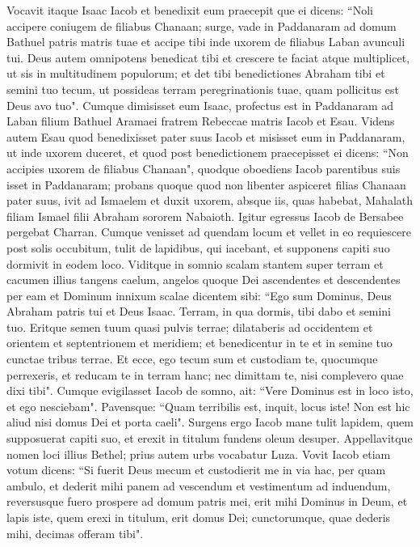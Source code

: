 \begin{biblechapter}  
\verse Vocavit itaque Isaac Iacob et benedixit eum praecepit que ei dicens: “Noli accipere coniugem de filiabus Chanaan; 
\verse surge, vade in Paddanaram ad domum Bathuel patris matris tuae et accipe tibi inde uxorem de filiabus Laban avunculi tui. 
\verse Deus autem omnipotens benedicat tibi et crescere te faciat atque multiplicet, ut sis in multitudinem populorum; 
\verse et det tibi benedictiones Abraham tibi et semini tuo tecum, ut possideas terram peregrinationis tuae, quam pollicitus est Deus avo tuo". 
\verse Cumque dimisisset eum Isaac, profectus est in Paddanaram ad Laban filium Bathuel Aramaei fratrem Rebeccae matris Iacob et Esau. 
\verse Videns autem Esau quod benedixisset pater suus Iacob et misisset eum in Paddanaram, ut inde uxorem duceret, et quod post benedictionem praecepisset ei dicens: “Non accipies uxorem de filiabus Chanaan", 
\verse quodque oboediens Iacob parentibus suis isset in Paddanaram; 
\verse probans quoque quod non libenter aspiceret filias Chanaan pater suus, 
\verse ivit ad Ismaelem et duxit uxorem, absque iis, quas habebat, Mahalath filiam Ismael filii Abraham sororem Nabaioth. 
\verse Igitur egressus Iacob de Bersabee pergebat Charran. 
\verse Cumque venisset ad quendam locum et vellet in eo requiescere post solis occubitum, tulit de lapidibus, qui iacebant, et supponens capiti suo dormivit in eodem loco. 
\verse Viditque in somnio scalam stantem super terram et cacumen illius tangens caelum, angelos quoque Dei ascendentes et descendentes per eam 
\verse et Dominum innixum scalae dicentem sibi: “Ego sum Dominus, Deus Abraham patris tui et Deus Isaac. Terram, in qua dormis, tibi dabo et semini tuo. 
\verse Eritque semen tuum quasi pulvis terrae; dilataberis ad occidentem et orientem et septentrionem et meridiem; et benedicentur in te et in semine tuo cunctae tribus terrae. 
\verse Et ecce, ego tecum sum et custodiam te, quocumque perrexeris, et reducam te in terram hanc; nec dimittam te, nisi complevero quae dixi tibi". 
\verse Cumque evigilasset Iacob de somno, ait: “Vere Dominus est in loco isto, et ego nesciebam". 
\verse Pavensque: “Quam terribilis est, inquit, locus iste! Non est hic aliud nisi domus Dei et porta caeli". 
\verse Surgens ergo Iacob mane tulit lapidem, quem supposuerat capiti suo, et erexit in titulum fundens oleum desuper. 
\verse Appellavitque nomen loci illius Bethel; prius autem urbs vocabatur Luza. 
\verse Vovit Iacob etiam votum dicens: “Si fuerit Deus mecum et custodierit me in via hac, per quam ambulo, et dederit mihi panem ad vescendum et vestimentum ad induendum, 
\verse reversusque fuero prospere ad domum patris mei, erit mihi Dominus in Deum, 
\verse et lapis iste, quem erexi in titulum, erit domus Dei; cunctorumque, quae dederis mihi, decimas offeram tibi". 
\end{biblechapter}

